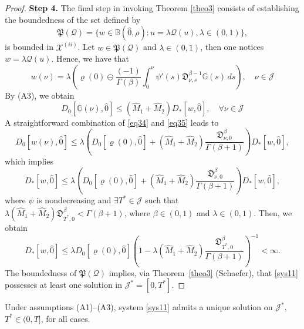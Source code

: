 \documentclass[reqno]{amsart}
\begin{document}
\begin{proof}
\noindent\textbf{Step 4.} The final step in invoking Theorem \ref{theo3} consists 
of establishing the boundedness of the set defined by
$$
\mathfrak{P}(\mathcal{Q})=\{ w \in \mathbb{B}(\hat{0}, \rho) :
 u=\lambda \mathcal{Q}(u), \lambda \in(0,1)\},
$$
is bounded in $\mathcal{X}^{(ii)}$. 
Let $ w \in \mathfrak{P}(\mathcal{Q})$ and $\lambda \in(0,1)$, then one notices 
$ w=\lambda \mathcal{Q}(u)$. Hence, we have that
\begin{equation}\label{eq34}
 w(\nu )=\lambda(\varrho(0) \ominus \frac{(-1)}{\Gamma(\beta)} 
 \int_0^{\nu } \psi'(s)\mathfrak{D}_{\nu ,s}^{\beta-1} \mathbb{G}(s)\,ds),
 \quad \nu \in\mathcal{J} 
\end{equation}
By (A3), we obtain
\begin{equation}\label{eq35}
D_0[\mathbb{G}(\nu ), \hat{0}] \leq(\hat{M}_{1}+\hat{M}_{2}) D_{*}[ w, \hat{0}],
 \quad \forall \nu \in\mathcal{J} 
\end{equation}
A straightforward combination of \eqref{eq34} and \eqref{eq35} leads to
$$
D_0[ w(\nu ), \hat{0}] \leq \lambda(D_0[\varrho(0), \hat{0}]+(\hat{M}_{1}
+\hat{M}_{2}) \frac{\mathfrak{D}_{\nu ,0}^{\beta}}{\Gamma(\beta+1)}) D_{*}[ w, \hat{0}],
$$
which implies
$$
D_{*}[ w, \hat{0}] \leq \lambda(D_0[\varrho(0), \hat{0}]+(\hat{M}_{1}+\hat{M}_{2}) 
\frac{\mathfrak{D}_{\nu ,0}^{\beta}}{\Gamma(\beta+1)}) D_{*}[ w, \hat{0}],
$$
where $\psi$ is nondecreasing and $\exists T^{*} \in \mathcal{J}$ such that 
$\lambda(\hat{M}_{1}+\hat{M}_{2})\mathfrak{D}_{T^{*},0}^{\beta}<\Gamma(\beta+1)$, 
where $\beta \in(0,1)$ and $\lambda \in(0,1)$. Then, we obtain
$$
D_{*}[ w, \hat{0}] \leq \lambda D_0[\varrho(0), \hat{0}](1-\lambda(\hat{M}_{1}
+\hat{M}_{2}) \frac{\mathfrak{D}_{T^{*},0}^{\beta}}{\Gamma(\beta+1)})^{-1}<\infty.
$$
The boundedness of $\mathfrak{P}(\mathcal{Q})$ implies, 
via Theorem~\ref{theo3} (Schaefer), that \eqref{sys11} possesses at least one 
solution in $\mathcal{J}^{*}=[0, T^{*}]$.
\end{proof}

\begin{theorem} \label{theo32}
Under assumptions {\rm (A1)--(A3)}, system \eqref{sys11} admits a unique solution 
on $\mathcal{J}^{*}$, $T^{*} \in (0, T]$, for all cases.
\end{theorem}
\end{document}
